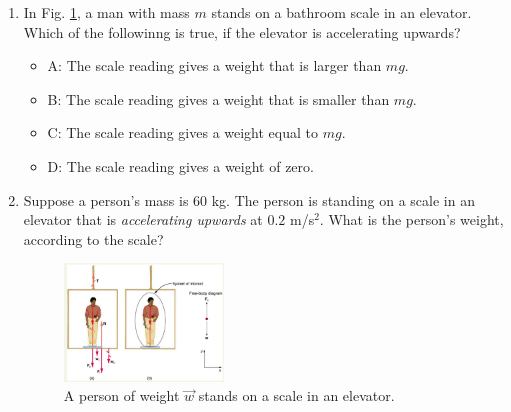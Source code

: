 \documentclass{article}
\begin{document}
\begin{enumerate}
\item In Fig. \ref{fig:elev}, a man with mass $m$ stands on a bathroom scale in an elevator.  Which of the followinng is true, if the elevator is accelerating upwards?
\begin{itemize}
\item A: The scale reading gives a weight that is larger than $mg$.
\item B: The scale reading gives a weight that is smaller than $mg$.
\item C: The scale reading gives a weight equal to $mg$.
\item D: The scale reading gives a weight of zero.
\end{itemize}
\item Suppose a person's mass is $60$ kg.  The person is standing on a scale in an elevator that is \textit{accelerating upwards} at $0.2$ m/s$^{2}$.  What is the person's weight, according to the scale? 
\begin{figure}[hb]
\centering
\includegraphics[width=0.4\textwidth]{elevator.png}
\caption{\label{fig:elev} A person of weight $\vec{w}$ stands on a scale in an elevator.}
\end{figure}
\end{enumerate}
\end{document}
